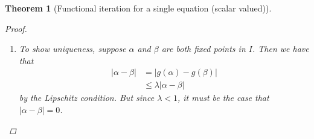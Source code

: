 \documentclass[12pt,letterpaper,DIV=11]{scrartcl}
\theoremstyle{plain}
\newtheorem{theorem}{Theorem}[section]
\theoremstyle{definition}
\theoremstyle{remark}
\newtheorem*{comment}{Comment}
\begin{document}
\begin{theorem}[Functional iteration for a single equation (scalar valued)]
\begin{proof}
\begin{enumerate}
        \begin{comment}
          How does $x_i$ approach our fixed point $\alpha$?
          Look at how far our initial guess is from $\alpha$, and the number of iterations we make: \begin{align*}
            |x_m - \alpha| &= |g(x_{m - 1}) - g(\alpha)| \\
                           &\leq \lambda |x_{m - 1} - \alpha| && \text{by the Lipschitz condition} \\
                           &= \lambda |g(x_{m - 2}) - g(\alpha)| \\
                           &\leq \lambda^2 |x_{m - 2} - \alpha| \\
                           &\vdotswithin{\leq} && \text{using the Lipschitz inequality}\\
                           &\leq \lambda^m |x_0 - \alpha| \\
                           &\leq \lambda^m  \rho,
          \end{align*} so each iterate is contained within a smaller and smaller set surrounding $\alpha$.
        \end{comment}

      \item To show uniqueness, suppose $\alpha$ and $\beta$ are both fixed points in $I$.
        Then we have that \begin{align*}
          |\alpha - \beta| &= |g(\alpha) - g(\beta)| \\
                           &\leq \lambda |\alpha - \beta|
        \end{align*} by the Lipschitz condition.
        But since $\lambda < 1$, it must be the case that $|\alpha - \beta| = 0$.
        \qedhere
    \end{enumerate}
  \end{proof}
\end{theorem}
\end{document}
